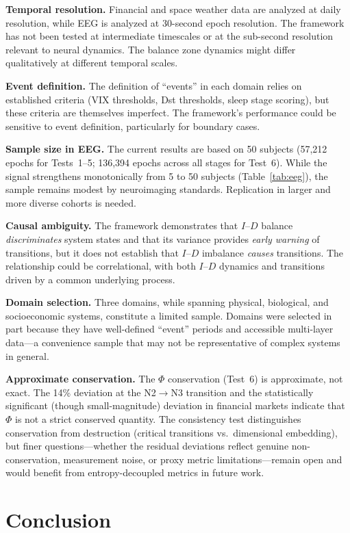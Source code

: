 \documentclass[12pt,a4paper]{article}
\begin{document}
\textbf{Temporal resolution.} Financial and space weather data are analyzed at daily resolution, while EEG is analyzed at 30-second epoch resolution. The framework has not been tested at intermediate timescales or at the sub-second resolution relevant to neural dynamics. The balance zone dynamics might differ qualitatively at different temporal scales.

\textbf{Event definition.} The definition of ``events'' in each domain relies on established criteria (VIX thresholds, Dst thresholds, sleep stage scoring), but these criteria are themselves imperfect. The framework's performance could be sensitive to event definition, particularly for boundary cases.

\textbf{Sample size in EEG.} The current results are based on 50 subjects (57,212 epochs for Tests~1--5; 136,394 epochs across all stages for Test~6). While the signal strengthens monotonically from 5 to 50 subjects (Table~\ref{tab:eeg}), the sample remains modest by neuroimaging standards. Replication in larger and more diverse cohorts is needed.

\textbf{Causal ambiguity.} The framework demonstrates that $I$--$D$ balance \emph{discriminates} system states and that its variance provides \emph{early warning} of transitions, but it does not establish that $I$--$D$ imbalance \emph{causes} transitions. The relationship could be correlational, with both $I$--$D$ dynamics and transitions driven by a common underlying process.

\textbf{Domain selection.} Three domains, while spanning physical, biological, and socioeconomic systems, constitute a limited sample. Domains were selected in part because they have well-defined ``event'' periods and accessible multi-layer data---a convenience sample that may not be representative of complex systems in general.

\textbf{Approximate conservation.} The $\Phi$ conservation (Test~6) is approximate, not exact. The 14\% deviation at the N2$\to$N3 transition and the statistically significant (though small-magnitude) deviation in financial markets indicate that $\Phi$ is not a strict conserved quantity. The consistency test distinguishes conservation from destruction (critical transitions vs.\ dimensional embedding), but finer questions---whether the residual deviations reflect genuine non-conservation, measurement noise, or proxy metric limitations---remain open and would benefit from entropy-decoupled metrics in future work.


\section{Conclusion}
\end{document}
